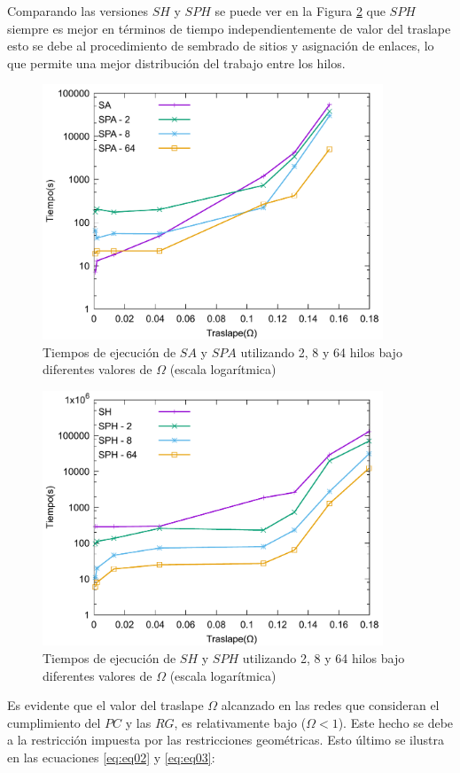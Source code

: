 Comparando las versiones $SH$ y $SPH$ se puede ver en la Figura \ref{fig:traslape-h} que $SPH$ siempre es mejor en términos de tiempo independientemente de valor del traslape esto se debe al procedimiento de sembrado de sitios y asignación de enlaces, lo que permite una mejor distribución del trabajo entre los hilos.\\

\begin{figure}[hbtp]
\centering
\includegraphics[width=4in]{graphs/traslape_mrg}
\caption{Tiempos de ejecución de $SA$ y $SPA$ utilizando 2, 8 y 64 hilos bajo diferentes valores de $\Omega$ (escala logarítmica)}
\label{fig:traslape-a}
\end{figure}

\begin{figure}[hbtp]
\centering
\includegraphics[width=4in]{graphs/traslape_hrg}
\caption{Tiempos de ejecución de $SH$ y $SPH$ utilizando 2, 8 y 64 hilos bajo diferentes valores de $\Omega$ (escala logarítmica)}
\label{fig:traslape-h}
\end{figure}

Es evidente que el valor del traslape $\Omega$ alcanzado en las redes que consideran el cumplimiento del $PC$ y las $RG$, es relativamente bajo ($\Omega<1$). Este hecho se debe a la restricción impuesta por las restricciones geométricas. Esto último se ilustra en las ecuaciones \ref{eq:eq02} y \ref{eq:eq03}:

